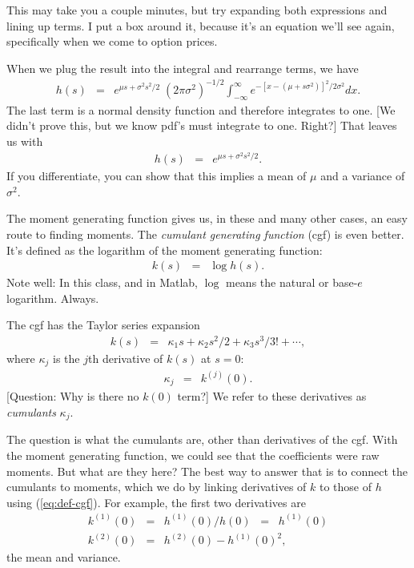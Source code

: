\documentclass[11pt]{article}
\begin{document}
\begin{itemize}
This may take you a couple minutes,  but try expanding both expressions and lining up terms.
I put a box around it, because it's an equation we'll see again,
specifically when we come to option prices.

When we plug the result into the integral and rearrange terms,
we have
\begin{eqnarray*}
        h(s) &=& e^{\mu s + \sigma^2 s^2/2} \; (2\pi \sigma^2)^{-1/2}
        \int_{-\infty}^\infty e^{-[x-(\mu+s\sigma^2)]^2/2\sigma^2} dx .
\end{eqnarray*}
The last term is a normal density function
and therefore integrates to one.
[We didn't prove this, but we know pdf's must integrate to one.  Right?]
That leaves us with
\begin{eqnarray*}
        h(s) &=& e^{\mu s + \sigma^2 s^2/2}  .
\end{eqnarray*}
If you differentiate, you can show that this implies
a mean of $\mu$ and a variance of $\sigma^2$.
\end{itemize}


The moment generating function gives us, in these and many other cases,
an easy route to finding moments.
The {\it cumulant generating function\/} (cgf) is even better.
It's defined as the logarithm of the moment generating function:
\begin{eqnarray}
    k(s) &=& \log h(s) .
    \label{eq:def-cgf}
\end{eqnarray}
Note well:  In this class, and in Matlab,
$\log$ means the natural or base-$e$ logarithm.
Always.

The cgf has the Taylor series expansion
\begin{eqnarray}
    k(s) &=& \kappa_1 s + \kappa_2 s^2/2 + \kappa_3 s^3/3! + \cdots  ,
    \label{eq:cumulant-expansion}
\end{eqnarray}
where $\kappa_j$ is the $j$th derivative of $k(s)$ at $s=0$:
\begin{eqnarray*}
    \kappa_j &=& k^{(j)}(0) .
\end{eqnarray*}
[Question:  Why is there no $k(0)$ term?]
We refer to these derivatives as {\it cumulants\/} $\kappa_j$.

The question is what the cumulants are, other than derivatives of the cgf.
With the moment generating function, we could see that the coefficients
were raw moments.
But what are they here?
The best way to answer that is to connect the cumulants to moments,
which we do by linking derivatives of $k$
to those of $h$ using (\ref{eq:def-cgf}).
For example, the first two derivatives are
\begin{eqnarray*}
    k^{(1)}(0) &=& h^{(1)}(0) / h(0) \;\;=\;\; h^{(1)}(0) \\
    k^{(2)}(0) &=& h^{(2)}(0) - h^{(1)}(0)^2 ,
\end{eqnarray*}
the mean and variance.
\end{document}
